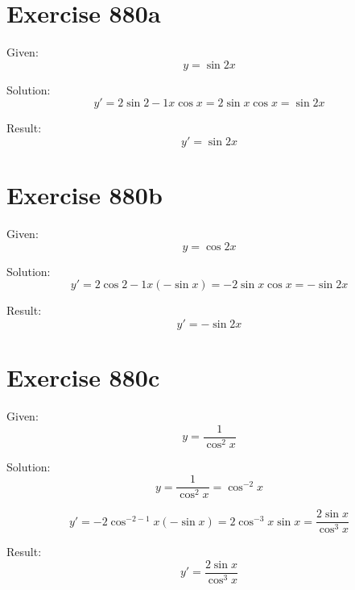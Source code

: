 \documentclass[a4paper, 10pt]{scrartcl}
\begin{document}
\section{Exercise 880a}

Given:
\[
y = \sin{2}{x}
\]

Solution:
\[
y' = 2\sin{2 - 1}{x}\cos{x} = 2\sin{x}\cos{x} = \sin{2x}
\]

Result:
\[
y' = \sin{2x}
\]

\section{Exercise 880b}

Given:
\[
y = \cos{2}{x}
\]

Solution:
\[
y' = 2\cos{2 - 1}{x}(-\sin{x}) = -2\sin{x}\cos{x} = -\sin{2x}
\]

Result:
\[
y' = -\sin{2x}
\]

\section{Exercise 880c}

Given:
\[
y = \frac{1}{\cos^{2}{x}}
\]

Solution:
\[
y = \frac{1}{\cos^{2}{x}} = \cos^{-2}{x}
\]

\[
y' = -2\cos^{-2 - 1}{x}(-\sin{x}) = 2\cos^{-3}{x}\sin{x} = \frac{2\sin{x}}{\cos^{3}{x}}
\]

Result:
\[
y' = \frac{2\sin{x}}{\cos^{3}{x}}
\]
\end{document}
